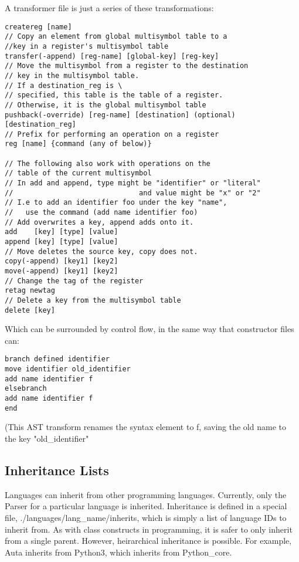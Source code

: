 \documentclass{article}
\begin{document}
A transformer file is just a series of these transformations:
\begin{verbatim}
createreg [name]
// Copy an element from global multisymbol table to a 
//key in a register's multisymbol table
transfer(-append) [reg-name] [global-key] [reg-key] 
// Move the multisymbol from a register to the destination 
// key in the multisymbol table. 
// If a destination_reg is \
// specified, this table is the table of a register. 
// Otherwise, it is the global multisymbol table
pushback(-override) [reg-name] [destination] (optional)[destination_reg]
// Prefix for performing an operation on a register
reg [name] {command (any of below)} 

// The following also work with operations on the 
// table of the current multisymbol
// In add and append, type might be "identifier" or "literal" 
//                              and value might be "x" or "2"
// I.e to add an identifier foo under the key "name", 
//   use the command (add name identifier foo)
// Add overwrites a key, append adds onto it.
add    [key] [type] [value]
append [key] [type] [value]
// Move deletes the source key, copy does not.
copy(-append) [key1] [key2]
move(-append) [key1] [key2]
// Change the tag of the register
retag newtag
// Delete a key from the multisymbol table
delete [key]
\end{verbatim}
Which can be surrounded by control flow, in the same way that constructor files can:
\begin{verbatim}
branch defined identifier 
move identifier old_identifier
add name identifier f
elsebranch
add name identifier f
end
\end{verbatim}
(This AST transform renames the syntax element to f, saving the old name to the key "old\_identifier"

\subsection{Inheritance Lists}

Languages can inherit from other programming languages.
Currently, only the Parser for a particular language is inherited.
Inheritance is defined in a special file, ./languages/lang\_name/inherits, which is simply a list of language IDs to inherit from.
As with class constructs in programming, it is safer to only inherit from a single parent.
However, heirarchical inheritance is possible.
For example, Auta inherits from Python3, which inherits from Python\_core.

\end{document}
